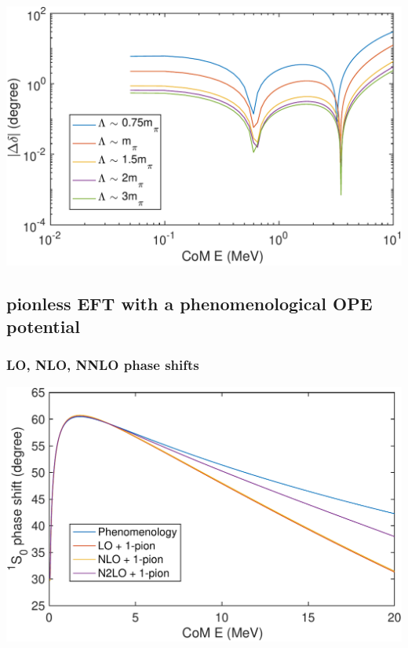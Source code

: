 \documentclass{article}
\newenvironment{Figure}
  {\par\medskip\noindent\minipage{\linewidth}}
  {\endminipage\par\medskip}
\begin{document}
\begin{multicols}{2}
\begin{Figure}
\centering
\includegraphics[width=\textwidth]{partc.pdf}
\end{Figure}

\subsection{pionless EFT with a phenomenological OPE potential}

\subsubsection{LO, NLO, NNLO phase shifts}

\begin{Figure}
\centering
\includegraphics[width=\textwidth]{ps2.pdf}
\end{Figure}


\end{multicols}
\end{document}
